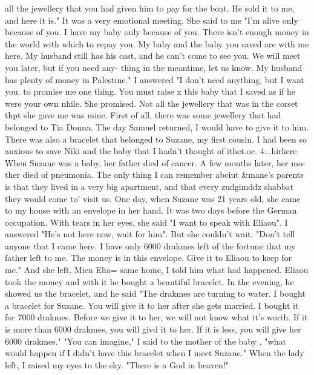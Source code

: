 all the jewellery that you had given him to pay for the boat. He sold it to me, and 
here it is." It was a very emotional meeting. She said to me "I'm alive only because 
of you. I have my baby only because of you. There isn't enough money in the world with 
which to repay you. My baby and the baby you saved are with me here. My husband still 
has his cast, and he can't come to see you. We will meet you later, but if you need any-
thing in the meantime, let us know. My husband has plenty of money in Palestine." I 
answered "I don't need anything, but I want you. to promise me one thing. You must raise 
x this baby that I saved as if he were your own nhile. She promised. 
Not all the jewellery that was in the corset thpt she gave me was mine. First of all, 
there was some jewellery that had belonged to Tia Donna. The day Samuel returned, I 
would have to give it to him. There was also a bracelet that belonged to Suzane, my first 
cousin. I had been so anxious to save Niki and the baby that I hadn't thought of 
ithet.oc. 4...hirkere 
When Suzane was a baby, her father died of cancer. A few months later, her mo-
ther died of pneumonia. The only thing I can remember abciut &mane's parents is that 
they lived in a very big apartment, and that every zudgimddz shabbat they would come to' 
visit us. One day, when Suzane was 21 years old, she came to my house with an envelope 
in her hand. It was two days before the German occupation. With tears in her eyes, she 
said "I want to speak with Eliaou". I answered "He's not here now, wait for him". 
But she couldn't wait. "Don't tell anyone that I came here. I have only 6000 drakmes 
left of the fortune that my father left to me. The money is in this envelope. Give it 
to Eliaou to keep for me." And she left. 
Mien Elia= same home, I told him what had happened. Eliaou took the money and 
with it he bought a beautiful bracelet. In the evening, he showed us the bracelet, and 
he said "The drakmes are turning to water. I bought a bracelet for Suzane. You will 
give it to her after she gets married. I bought it for 7000 drakmes. Before we give 
it to her, we will not know what it's worth. If it is more than 6000 drakmes, you will 
givd it to her. If it is less, you will give her 6000 drakmes." 
"You can imagine," I said to the mother of the baby , "what would happen if I 
didn't have this bracelet when I meet Suzane." When the lady left, I raised my eyes 
to the sky. "There is a God in heaven!" 
